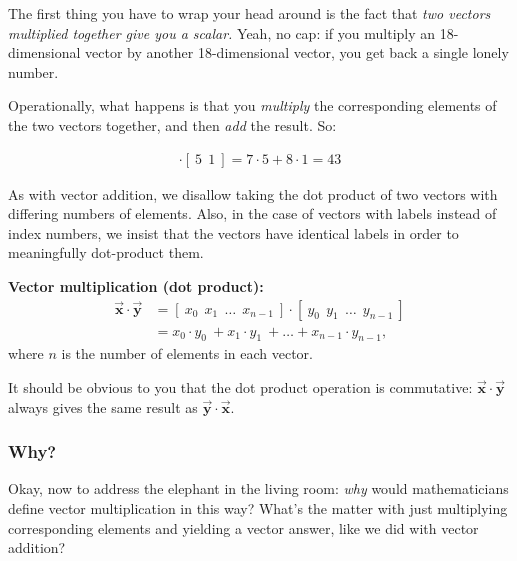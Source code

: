 The first thing you have to wrap your head around is the fact that \textit{two
vectors multiplied together give you a scalar.} Yeah, no cap: if you multiply
an 18-dimensional vector by another 18-dimensional vector, you get back a
single lonely number.

Operationally, what happens is that you \textit{multiply} the corresponding
elements of the two vectors together, and then \textit{add} the result. So:

\vspace{-.15in}
\begin{align*}
[\ 7\ \ 8\ ] \cdot [\ 5\ \ 1\ ] = 7\cdot 5 + 8\cdot1 = 43
\end{align*}
\vspace{-.15in}

As with vector addition, we disallow taking the dot product of two vectors with
differing numbers of elements. Also, in the case of vectors with labels instead
of index numbers, we insist that the vectors have identical labels in order to
meaningfully dot-product them.

\begin{center}
\begin{framed}
\textbf{Vector multiplication (dot product):}
\begin{align*}
\overrightarrow{\textbf{x}} \cdot \overrightarrow{\textbf{y}} &=
[\ x_0\ \ x_1\ \ \dots \ \ x_{n-1}\ ] \cdot
[\ y_0\ \ y_1\ \ \dots \ \ y_{n-1}\ ] \\
&= x_0 \cdot y_0\ + x_1 \cdot y_1\ + \dots + x_{n-1} \cdot y_{n-1},
\end{align*}
where $n$ is the number of elements in each vector.
\end{framed}
\end{center}
\vspace{-.15in}


It should be obvious to you that the dot product operation is commutative:
$\overrightarrow{\textbf{x}} \cdot \overrightarrow{\textbf{y}}$ always gives
the same result as $\overrightarrow{\textbf{y}} \cdot
\overrightarrow{\textbf{x}}$.

\subsubsection{Why?}

Okay, now to address the elephant in the living room: \textit{why} would
mathematicians define vector multiplication in this way? What's the matter with
just multiplying corresponding elements and yielding a vector answer, like we
did with vector addition?

